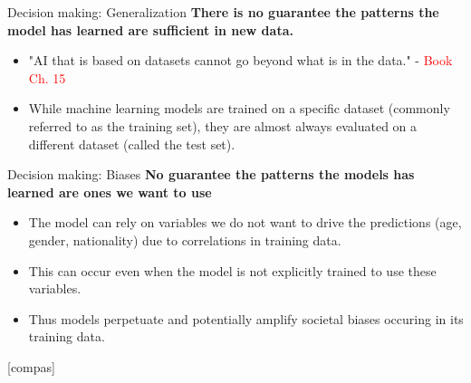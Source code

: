 \documentclass[8pt]{beamer}
\begin{document}
	\begin{frame}[t]{Decision making: Generalization} %
		\centering
		\textbf{There is no guarantee the patterns the model has learned are sufficient in new data.}
		\begin{itemize}
			\item "AI that is based on datasets cannot go beyond what is in the data." - \textcolor{red}{Book Ch. 15}
			\item While machine learning models are trained on a specific dataset (commonly referred to as the training set), they are almost always evaluated on a different dataset (called the test set).
		\end{itemize}
		\vspace{0.5cm}
	\end{frame}

	\begin{frame}[t]{Decision making: Biases} %
		\textbf{No guarantee the patterns the models has learned are ones we want to use}
		\begin{itemize}
			\item The model can rely on variables we do not want to drive the predictions (age, gender, nationality) due to correlations in training data.
			\item This can occur even when the model is not explicitly trained to use these variables.
			\item Thus models perpetuate and potentially amplify societal biases occuring in its training data.
		\end{itemize}
	\end{frame}

	[compas]
\end{document}
